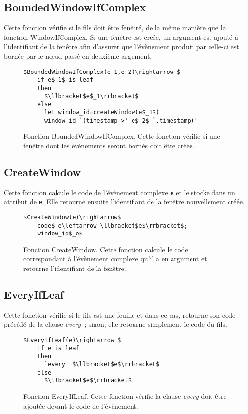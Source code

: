 \subsection*{BoundedWindowIfComplex}
Cette fonction vérifie si le fils doit être fenêtré, de la même manière que la fonction WindowIfComplex. Si une fenêtre est créée, un argument est ajouté à l'identifiant de la fenêtre afin d'assurer que l'évènement produit par celle-ci est bornée par le n{\oe}ud passé
en deuxième argument.
\begin{figure}[!h]
\begin{lstlisting}[frame=bt]
  $BoundedWindowIfComplex(e_1,e_2)\rightarrow $
    if e$_1$ is leaf
    then
      $\llbracket$e$_1\rrbracket$
    else
      let window_id=createWindow(e$_1$)
      window_id `(timestamp >' e$_2$ `.timestamp)'
\end{lstlisting}
\caption{Fonction BoundedWindowIfComplex. Cette fonction vérifie si une fenêtre dont les évènements seront bornés doit être créée.}
\label{listing:createwindow}
\end{figure}

\subsection*{CreateWindow}
Cette fonction 
calcule le code de l'évènement complexe {\tt e} et le stocke dans un attribut de {\tt e}. %
Elle retourne ensuite l'identifiant de la fenêtre nouvellement créée.
\begin{figure}[!h]
\begin{lstlisting}[frame=bt]
  $CreateWindow(e)\rightarrow$ 
    code$_e\leftarrow \llbracket$e$\rrbracket$;
    window_id$_e$
\end{lstlisting}
\caption{Fonction CreateWindow. Cette fonction calcule le code correspondant à l'évènement complexe qu'il a en argument et retourne l'identifiant de la fenêtre.}
\label{listing:createwindow}
\end{figure}

\subsection*{EveryIfLeaf}
Cette fonction vérifie si le fils est une feuille et dans ce cas, retourne son code précédé de la clause {\em every}~; sinon, elle retourne simplement le code du fils. 
\begin{figure}[!h]
\begin{lstlisting}[frame=bt]
  $EveryIfLeaf(e)\rightarrow $
    if e is leaf
    then 
      `every' $\llbracket$e$\rrbracket$
    else 
      $\llbracket$e$\rrbracket$
\end{lstlisting}
\caption{Fonction EveryIfLeaf. Cette fonction vérifie la clause {\em every} doit être ajoutée devant le code de l'évènement.}
\label{listing:windoifcomplex}
\end{figure}

